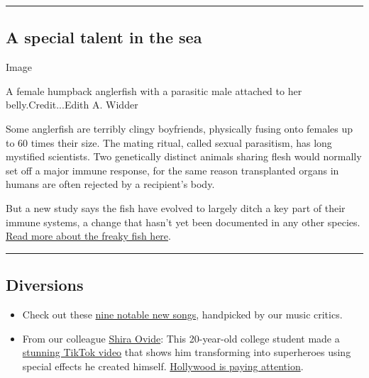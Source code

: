 \begin{center}\rule{0.5\linewidth}{\linethickness}\end{center}

\hypertarget{a-special-talent-in-the-sea}{%
\subsection{A special talent in the
sea}\label{a-special-talent-in-the-sea}}

Image

A female humpback anglerfish with a parasitic male attached to her
belly.Credit...Edith A. Widder

Some anglerfish are terribly clingy boyfriends, physically fusing onto
females up to 60 times their size. The mating ritual, called sexual
parasitism, has long mystified scientists. Two genetically distinct
animals sharing flesh would normally set off a major immune response,
for the same reason transplanted organs in humans are often rejected by
a recipient's body.

But a new study says the fish have evolved to largely ditch a key part
of their immune systems, a change that hasn't yet been documented in any
other species.
\href{https://www.nytimes.com/2020/07/30/science/anglerfish-immune-rejection.html}{Read
more about the freaky fish here}.

\begin{center}\rule{0.5\linewidth}{\linethickness}\end{center}

\hypertarget{diversions}{%
\subsection{Diversions}\label{diversions}}

\begin{itemize}
\item
  Check out these
  \href{https://www.nytimes.com/2020/07/31/arts/music/playlist-billie-eilish-snakehips-a-boogie.html}{nine
  notable new songs}, handpicked by our music critics.
\item
  From our colleague
  \href{https://www.nytimes.com/newsletters/signup/OT}{Shira Ovide}:
  This 20-year-old college student made a
  \href{https://www.tiktok.com/@thejulianbass/video/6844906456471457030?lang=en}{stunning
  TikTok video} that shows him transforming into superheroes using
  special effects he created himself.
  \href{https://www.kqed.org/arts/13882973/a-student-gets-supersized-attention-after-superhero-video-goes-viral}{Hollywood
  is paying attention}.
\end{itemize}

